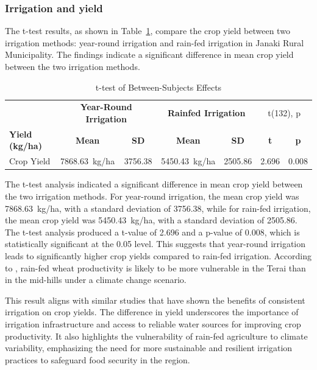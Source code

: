 \subsubsection{Irrigation and yield}


The t-test results, as shown in Table~\ref{tab:t_test_irrigation}, compare the crop yield between two irrigation methods: year-round irrigation and rain-fed irrigation in Janaki Rural Municipality. The findings indicate a significant difference in mean crop yield between the two irrigation methods.

\begin{table}[htbp]
    \centering
    \caption{t-test of Between-Subjects Effects}
    \label{tab:t_test_irrigation}
    \begin{tabular}{@{}l c c c c c c@{}}
        \toprule
        & \multicolumn{2}{c}{\textbf{Year-Round Irrigation}} & \multicolumn{2}{c}{\textbf{Rainfed Irrigation}} & \multicolumn{2}{c}{t(132), p} \\
        \cmidrule(lr){2-3} \cmidrule(lr){4-5}
        \textbf{Yield (kg/ha)} & \textbf{Mean} & \textbf{SD} & \textbf{Mean} & \textbf{SD} & \textbf{t} & \textbf{p} \\
        \midrule
        Crop Yield & 7868.63~kg/ha & 3756.38 & 5450.43~kg/ha & 2505.86 & 2.696 & 0.008 \\
        \bottomrule
    \end{tabular}
\end{table}

The t-test analysis indicated a significant difference in mean crop yield between the two irrigation methods. For year-round irrigation, the mean crop yield was 7868.63~kg/ha, with a standard deviation of 3756.38, while for rain-fed irrigation, the mean crop yield was 5450.43~kg/ha, with a standard deviation of 2505.86. The t-test analysis produced a t-value of 2.696 and a p-value of 0.008, which is statistically significant at the 0.05 level. This suggests that year-round irrigation leads to significantly higher crop yields compared to rain-fed irrigation. According to \citet{mallaClimateChangeIts2009}, rain-fed wheat productivity is likely to be more vulnerable in the Terai than in the mid-hills under a climate change scenario.

This result aligns with similar studies that have shown the benefits of consistent irrigation on crop yields. The difference in yield underscores the importance of irrigation infrastructure and access to reliable water sources for improving crop productivity. It also highlights the vulnerability of rain-fed agriculture to climate variability, emphasizing the need for more sustainable and resilient irrigation practices to safeguard food security in the region.


